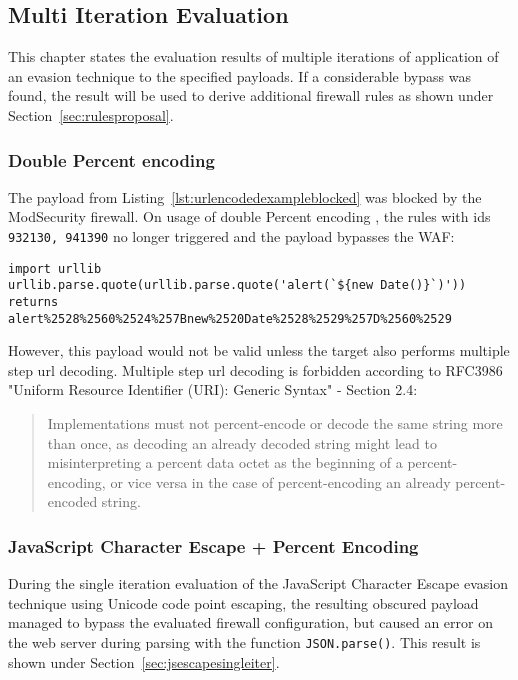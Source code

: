 \subsection{Multi Iteration Evaluation}
\label{sec:multiiteration}
This chapter states the evaluation results of multiple iterations of application of an evasion technique to the specified payloads. If a considerable bypass was found, the result will be used to derive additional firewall rules as shown under Section~\ref{sec:rulesproposal}.

\subsubsection{Double Percent encoding}
\label{sec:doublepercenc}
The payload from Listing~\ref{lst:urlencodedexampleblocked} was blocked by the ModSecurity firewall.
On usage of double Percent encoding , the rules with ids \verb|932130, 941390| no longer triggered and the payload bypasses the WAF:

\begin{lstlisting}[style=basicStyle]
import urllib
urllib.parse.quote(urllib.parse.quote('alert(`${new Date()}`)'))
returns
alert%2528%2560%2524%257Bnew%2520Date%2528%2529%257D%2560%2529
\end{lstlisting}

However, this payload would not be valid unless the target also performs multiple step url decoding. Multiple step url decoding is forbidden according to RFC3986 "Uniform Resource Identifier (URI): Generic Syntax" - Section 2.4:
\begin{quote}
	Implementations must not
	percent-encode or decode the same string more than once, as decoding
	an already decoded string might lead to misinterpreting a percent
	data octet as the beginning of a percent-encoding, or vice versa in
	the case of percent-encoding an already percent-encoded string. \cite{rfc3986/sec2.4}
\end{quote}


\subsubsection{JavaScript Character Escape + Percent Encoding}
\label{sec:jsencpercenc}
During the single iteration evaluation of the JavaScript Character Escape evasion technique using Unicode code point escaping, the resulting obscured payload managed to bypass the evaluated firewall configuration, but caused an error on the web server during parsing with the function \verb|JSON.parse()|. This result is shown under Section~\ref{sec:jsescapesingleiter}.

